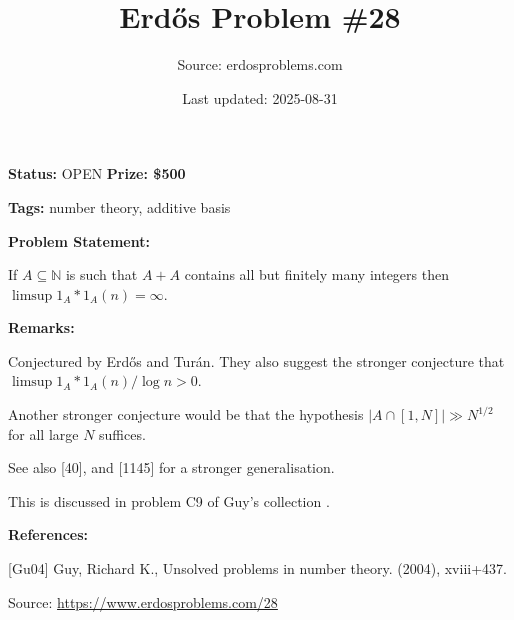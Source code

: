 \documentclass{article}
\title{Erd\H{o}s Problem \#28}
\date{Last updated: 2025-08-31}
\author{Source: erdosproblems.com}
\begin{document}
\maketitle

\noindent\textbf{Status:} OPEN \quad \textbf{Prize: \$500}

\noindent\textbf{Tags:} number theory, additive basis

\medskip
\noindent\textbf{Problem Statement:}

If $A\subseteq \mathbb{N}$ is such that $A+A$ contains all but finitely many integers then $\limsup 1_A\ast 1_A(n)=\infty$.

\bigskip
\noindent\textbf{Remarks:}

Conjectured by Erd\H{o}s and Tur\'{a}n. They also suggest the stronger conjecture that $\limsup 1_A\ast 1_A(n)/\log n>0$. 

Another stronger conjecture would be that the hypothesis $\lvert A\cap [1,N]\rvert \gg N^{1/2}$ for all large $N$ suffices.

See also [40], and [1145] for a stronger generalisation.

This is discussed in problem C9 of Guy's collection \cite{Gu04}.

\bigskip
\noindent\textbf{References:}

[Gu04] Guy, Richard K., Unsolved problems in number theory. (2004), xviii+437.

\bigskip
\noindent\small{Source: \url{https://www.erdosproblems.com/28}}
\end{document}
